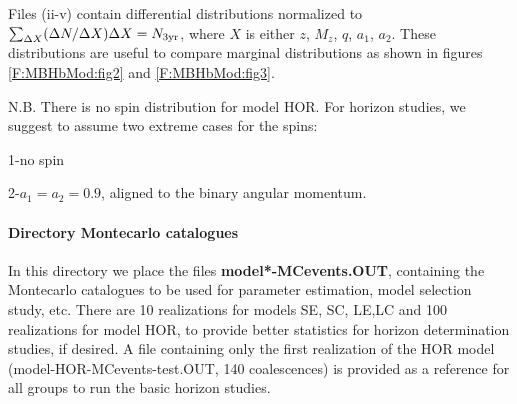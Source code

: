 \documentclass{iopart}
\newenvironment{itemize_estret}{
\begin{itemize}
  \setlength{\itemsep}{1pt}
  \setlength{\parskip}{0pt}
  \setlength{\parsep}{0pt}
}{\end{itemize}}
\begin{document}
Files (ii-v) contain differential distributions normalized to $\sum_{\Delta{X}}(\Delta{N}/\Delta{X})\Delta{X}=N_{3{\rm yr}}$, 
where $X$ is either $z$, $M_z$, $q$, $a_1$, $a_2$. These distributions are useful to compare 
marginal distributions as shown in figures \ref{F:MBHbMod:fig2} and \ref{F:MBHbMod:fig3}.

N.B. There is no spin distribution for model HOR. For horizon
studies, we suggest to assume two extreme cases for the spins:
\begin{itemize_estret}
\item 1-no spin
\item 2-$a_1=a_2=0.9$, aligned to the binary angular momentum.
\end{itemize_estret}

\paragraph{Directory Montecarlo catalogues}
In this directory we place the files {\bf model*-MCevents.OUT}, containing
the Montecarlo catalogues to be used for parameter estimation, model 
selection study, etc. There are 10 realizations for models SE, SC, LE,LC and 100 realizations for 
model HOR, to provide better statistics for horizon determination
studies, if desired.  A file containing only the first realization of the HOR model (model-HOR-MCevents-test.OUT,  140 coalescences)
is provided as a reference for all groups to run the basic horizon studies. 
\end{document}
